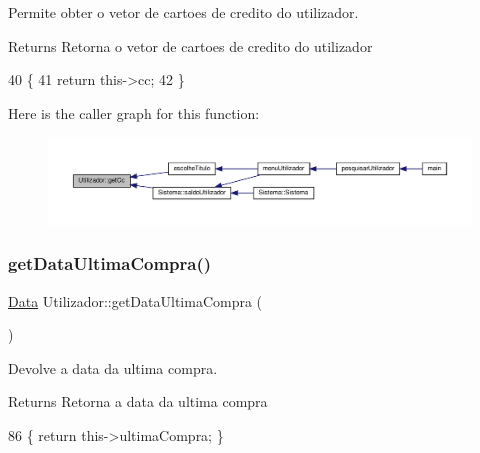 Permite obter o vetor de cartoes de credito do utilizador. 

\begin{DoxyReturn}{Returns}
Retorna o vetor de cartoes de credito do utilizador 
\end{DoxyReturn}

\begin{DoxyCode}
40                                                  \{
41     \textcolor{keywordflow}{return} this->cc;
42 \}
\end{DoxyCode}
Here is the caller graph for this function\+:
\nopagebreak
\begin{figure}[H]
\begin{center}
\leavevmode
\includegraphics[width=350pt]{classUtilizador_ad0ebe5ff80aa77145ec4b0ce5473102c_icgraph}
\end{center}
\end{figure}
\mbox{\label{classUtilizador_a68fcb8d8b1ebce49da37439aaa1a7b79}} 
\subsubsection{\texorpdfstring{get\+Data\+Ultima\+Compra()}{getDataUltimaCompra()}}
{\footnotesize\ttfamily \hyperlink{classData}{Data} Utilizador\+::get\+Data\+Ultima\+Compra (\begin{DoxyParamCaption}{ }\end{DoxyParamCaption})\hspace{0.3cm}{\ttfamily [inline]}}



Devolve a data da ultima compra. 

\begin{DoxyReturn}{Returns}
Retorna a data da ultima compra 
\end{DoxyReturn}

\begin{DoxyCode}
86 \{ \textcolor{keywordflow}{return} this->ultimaCompra; \}
\end{DoxyCode}
\mbox{\label{classUtilizador_aea88bb297704762d0cccc909b8c2da54}} 
